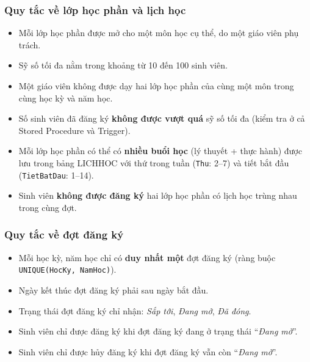 \documentclass[13pt, a4paper]{article}
\begin{document}
\subsubsection{Quy tắc về lớp học phần và lịch học}
\begin{itemize}[leftmargin=1.5cm]
  \item Mỗi lớp học phần được mở cho một môn học cụ thể, do một giáo viên phụ trách.
  \item Sỹ số tối đa nằm trong khoảng từ 10 đến 100 sinh viên.
  \item Một giáo viên không được dạy hai lớp học phần của cùng một môn trong cùng học kỳ và năm học.
  \item Số sinh viên đã đăng ký \textbf{không được vượt quá} sỹ số tối đa (kiểm tra ở cả Stored Procedure và Trigger).
  \item Mỗi lớp học phần có thể có \textbf{nhiều buổi học} (lý thuyết + thực hành) được lưu trong bảng LICHHOC với thứ trong tuần (\texttt{Thu}: 2--7) và tiết bắt đầu (\texttt{TietBatDau}: 1--14).
  \item Sinh viên \textbf{không được đăng ký} hai lớp học phần có lịch học trùng nhau trong cùng đợt.
\end{itemize}

\subsubsection{Quy tắc về đợt đăng ký}
\begin{itemize}[leftmargin=1.5cm]
  \item Mỗi học kỳ, năm học chỉ có \textbf{duy nhất một} đợt đăng ký (ràng buộc \texttt{UNIQUE(HocKy, NamHoc)}).
  \item Ngày kết thúc đợt đăng ký phải sau ngày bắt đầu.
  \item Trạng thái đợt đăng ký chỉ nhận: \emph{Sắp tới}, \emph{Đang mở}, \emph{Đã đóng}.
  \item Sinh viên chỉ được đăng ký khi đợt đăng ký đang ở trạng thái ``\emph{Đang mở}''.
  \item Sinh viên chỉ được hủy đăng ký khi đợt đăng ký vẫn còn ``\emph{Đang mở}''.
\end{itemize}
\end{document}
